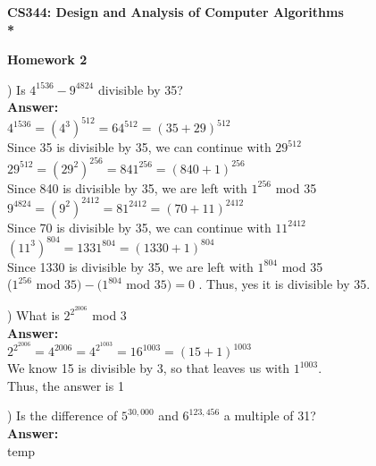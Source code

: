 \documentclass{article}
\begin{document}
\begin{center}
\bf{\LARGE CS344: Design and Analysis of Computer Algorithms} \\*

\vspace{0.2in}
{\bf {\Large Homework 2}}
\end{center}

\vspace{.2in}


\vspace{.2in}
) Is $4^{1536} - 9^{4824}$ divisible by 35? \\
\vspace{.1in}
{\bf Answer:} \\
\indent $4^{1536} = (4^3)^{512} = 64^{512} = (35 + 29)^{512}$ \\
\indent Since 35 is divisible by 35, we can continue with $29^{512}$ \\
\indent $29^{512} = (29^2)^{256} = 841^{256} = (840 + 1)^{256}$ \\
\indent Since 840 is divisible by 35, we are left with $1^{256}$ mod 35 \\

\indent $9^4824 = (9^2)^{2412} = 81^{2412} = (70 + 11)^{2412}$ \\
\indent Since 70 is divisible by 35, we can continue with $11^{2412}$ \\
\indent $(11^3)^{804} = 1331^{804} = (1330 + 1)^{804}$ \\
\indent Since 1330 is divisible by 35, we are left with $1^{804}$ mod 35 \\

\indent ($1^{256}$ mod $35) - (1^{804}$ mod $35) = 0$ . Thus, yes it is divisible by 35.

\vspace{.3in}
) What is $2^{2^{2006}}$ mod 3 \\
\vspace{.1in}
{\bf Answer:} \\
\indent $2^{2^{2006}} =  4^{2006} = 4^{2^{1003}} = 16^{1003 } = (15 + 1)^{1003}$ \\
\indent We know 15 is divisible by 3, so that leaves us with $1^{1003}$. \\
\indent Thus, the answer is 1

\vspace{.3in}
) Is the difference of $5^{30,000}$ and $6^{123,456}$ a multiple of 31? \\
\vspace{.1in}
{\bf Answer:} \\
\indent temp
\end{document}
